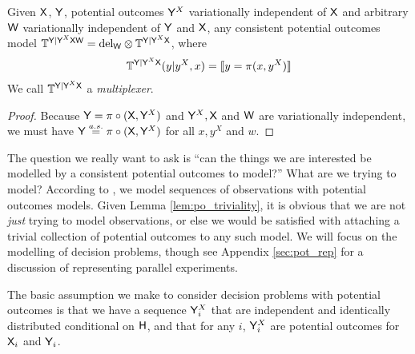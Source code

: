 \begin{lemma}
Given $\mathsf{X}$, $\mathsf{Y}$, potential outcomes $\mathsf{Y}^X$ variationally independent of $\mathsf{X}$ and arbitrary $\mathsf{W}$ variationally independent of $\mathsf{Y}$ and $\mathsf{X}$, any consistent potential outcomes model $\mathbb{T}^{\mathsf{Y}|\mathsf{Y}^X\mathsf{X}\mathsf{W}}=\text{del}_{\mathsf{W}} \otimes \mathbb{T}^{\mathsf{Y}|\mathsf{Y}^X\mathsf{X}}$, where
\begin{align}
    \mathbb{T}^{\mathsf{Y}|\mathsf{Y}^X\mathsf{X}}(y|y^X,x) = \llbracket y=\pi(x,y^X) \rrbracket\\
\end{align}
We call $\mathbb{T}^{\mathsf{Y}|\mathsf{Y}^X\mathsf{X}}$ a \emph{multiplexer}.
\end{lemma}

\begin{proof}
Because $\mathsf{Y} = \pi\circ(\mathsf{X},\mathsf{Y}^X)$ and $\mathsf{Y}^X, \mathsf{X}$ and $\mathsf{W}$ are variationally independent, we must have $\mathsf{Y} \overset{a.s.}{=} \pi\circ(\mathsf{X},\mathsf{Y}^X)$ for all $x, y^X$ and $w$.
\end{proof}

The question we really want to ask is ``can the things we are interested be modelled by a consistent potential outcomes to model?'' What are we trying to model? According to \citet{rubin_causal_2005}, we model sequences of observations with potential outcomes models. Given Lemma \ref{lem:po_triviality}, it is obvious that we are not \emph{just} trying to model observations, or else we would be satisfied with attaching a trivial collection of potential outcomes to any such model. We will focus on the modelling of decision problems, though see Appendix \ref{sec:pot_rep} for a discussion of representing parallel experiments.

The basic assumption we make to consider decision problems with potential outcomes is that we have a sequence $\mathsf{Y}^X_i$ that are independent and identically distributed conditional on $\mathsf{H}$, and that for any $i$, $\mathsf{Y}^X_i$ are potential outcomes for $\mathsf{X}_i$ and $\mathsf{Y}_i$.

\begin{align}

\end{align}